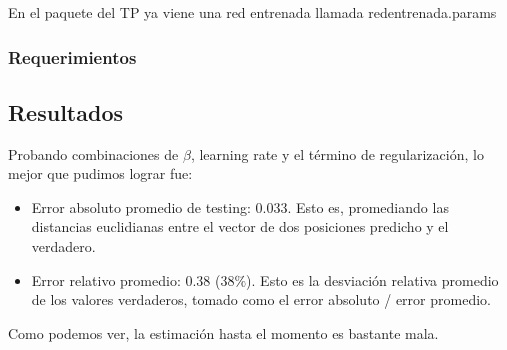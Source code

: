 En el paquete del TP ya viene una red entrenada llamada redentrenada.params

\subsubsection{Requerimientos}


\subsection{Resultados}

Probando combinaciones de $\beta$, learning rate y el término de regularización, lo mejor que pudimos lograr fue:

\begin{itemize}
	\item Error absoluto promedio de testing: 0.033. Esto es, promediando las distancias euclidianas entre el vector de dos posiciones predicho y el verdadero. 
	\item Error relativo promedio: 0.38 (38$\%$). Esto es la desviación relativa promedio de los valores verdaderos, tomado como el error absoluto / error promedio.
\end{itemize}

Como podemos ver, la estimación hasta el momento es bastante mala.


